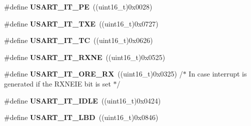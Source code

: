 \begin{DoxyCompactItemize}
\item 
\hypertarget{group___u_s_a_r_t___interrupt__definition_gae607c28a462c224c575b7541dc4f7067}{\#define {\bfseries U\-S\-A\-R\-T\-\_\-\-I\-T\-\_\-\-P\-E}~((uint16\-\_\-t)0x0028)}\label{group___u_s_a_r_t___interrupt__definition_gae607c28a462c224c575b7541dc4f7067}

\item 
\hypertarget{group___u_s_a_r_t___interrupt__definition_gab18d0fe889204a4c34f6d5817fb5147d}{\#define {\bfseries U\-S\-A\-R\-T\-\_\-\-I\-T\-\_\-\-T\-X\-E}~((uint16\-\_\-t)0x0727)}\label{group___u_s_a_r_t___interrupt__definition_gab18d0fe889204a4c34f6d5817fb5147d}

\item 
\hypertarget{group___u_s_a_r_t___interrupt__definition_ga748e86162cc110513330079982821c39}{\#define {\bfseries U\-S\-A\-R\-T\-\_\-\-I\-T\-\_\-\-T\-C}~((uint16\-\_\-t)0x0626)}\label{group___u_s_a_r_t___interrupt__definition_ga748e86162cc110513330079982821c39}

\item 
\hypertarget{group___u_s_a_r_t___interrupt__definition_gacdd49b93072655a21a63a35e6431f8ae}{\#define {\bfseries U\-S\-A\-R\-T\-\_\-\-I\-T\-\_\-\-R\-X\-N\-E}~((uint16\-\_\-t)0x0525)}\label{group___u_s_a_r_t___interrupt__definition_gacdd49b93072655a21a63a35e6431f8ae}

\item 
\hypertarget{group___u_s_a_r_t___interrupt__definition_gaad8fd44c80b30285dc3088a0b3aa5bd9}{\#define {\bfseries U\-S\-A\-R\-T\-\_\-\-I\-T\-\_\-\-O\-R\-E\-\_\-\-R\-X}~((uint16\-\_\-t)0x0325) /$\ast$ In case interrupt is generated if the R\-X\-N\-E\-I\-E bit is set $\ast$/}\label{group___u_s_a_r_t___interrupt__definition_gaad8fd44c80b30285dc3088a0b3aa5bd9}

\item 
\hypertarget{group___u_s_a_r_t___interrupt__definition_ga5d85aab24b7b2dfddb61ba2a49fa6185}{\#define {\bfseries U\-S\-A\-R\-T\-\_\-\-I\-T\-\_\-\-I\-D\-L\-E}~((uint16\-\_\-t)0x0424)}\label{group___u_s_a_r_t___interrupt__definition_ga5d85aab24b7b2dfddb61ba2a49fa6185}

\item 
\hypertarget{group___u_s_a_r_t___interrupt__definition_ga063628e16cdda199b07d380421afc4a5}{\#define {\bfseries U\-S\-A\-R\-T\-\_\-\-I\-T\-\_\-\-L\-B\-D}~((uint16\-\_\-t)0x0846)}\label{group___u_s_a_r_t___interrupt__definition_ga063628e16cdda199b07d380421afc4a5}


\end{DoxyCompactItemize}
